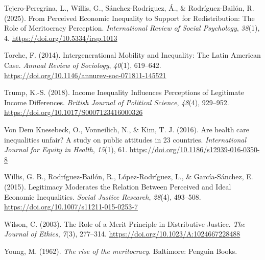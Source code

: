 \documentclass[
  12pt,
]{article}
\newlength{\cslhangindent}
\newenvironment{CSLReferences}[2] %
 {\begin{list}{}{%
  \setlength{\itemindent}{0pt}
  \setlength{\leftmargin}{0pt}
  \setlength{\parsep}{0pt}
  \ifodd #1
   \setlength{\leftmargin}{\cslhangindent}
   \setlength{\itemindent}{-1\cslhangindent}
  \fi
  \setlength{\itemsep}{#2\baselineskip}}}
 {\end{list}}
\begin{document}
\begin{CSLReferences}{1}{0}
Tejero-Peregrina, L., Willis, G., Sánchez-Rodríguez, Á., \&
Rodríguez-Bailón, R. (2025). From {Perceived Economic Inequality} to
{Support} for {Redistribution}: {The Role} of {Meritocracy Perception}.
\emph{International Review of Social Psychology}, \emph{38}(1), 4.
\url{https://doi.org/10.5334/irsp.1013}

Torche, F. (2014). Intergenerational {Mobility} and {Inequality}: {The
Latin American Case}. \emph{Annual Review of Sociology}, \emph{40}(1),
619--642. \url{https://doi.org/10.1146/annurev-soc-071811-145521}

Trump, K.-S. (2018). Income {Inequality Influences Perceptions} of
{Legitimate Income Differences}. \emph{British Journal of Political
Science}, \emph{48}(4), 929--952.
\url{https://doi.org/10.1017/S0007123416000326}

Von Dem Knesebeck, O., Vonneilich, N., \& Kim, T. J. (2016). Are health
care inequalities unfair? {A} study on public attitudes in 23 countries.
\emph{International Journal for Equity in Health}, \emph{15}(1), 61.
\url{https://doi.org/10.1186/s12939-016-0350-8}

Willis, G. B., Rodríguez-Bailón, R., López-Rodríguez, L., \&
García-Sánchez, E. (2015). Legitimacy {Moderates} the {Relation Between
Perceived} and {Ideal Economic Inequalities}. \emph{Social Justice
Research}, \emph{28}(4), 493--508.
\url{https://doi.org/10.1007/s11211-015-0253-7}

Wilson, C. (2003). The {Role} of a {Merit Principle} in {Distributive
Justice}. \emph{The Journal of Ethics}, \emph{7}(3), 277--314.
\url{https://doi.org/10.1023/A:1024667228488}

Young, M. (1962). \emph{The rise of the meritocracy}. Baltimore: Penguin
Books.

\end{CSLReferences}
\end{document}
